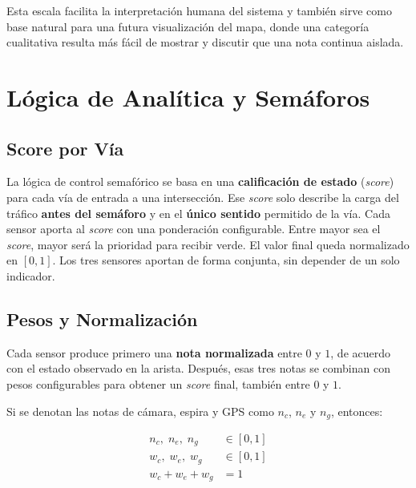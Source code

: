 \documentclass[12pt, a4paper]{article}
\begin{document}
Esta escala facilita la interpretación humana del sistema y también sirve como base natural para una futura visualización del mapa, donde una categoría cualitativa resulta más fácil de mostrar y discutir que una nota continua aislada.

\section{Lógica de Analítica y Semáforos}

\subsection{Score por Vía}

La lógica de control semafórico se basa en una \textbf{calificación de estado} (\textit{score}) para cada vía de entrada a una intersección. Ese \textit{score} solo describe la carga del tráfico \textbf{antes del semáforo} y en el \textbf{único sentido} permitido de la vía. Cada sensor aporta al \textit{score} con una ponderación configurable. Entre mayor sea el \textit{score}, mayor será la prioridad para recibir verde. El valor final queda normalizado en $[0, 1]$. Los tres sensores aportan de forma conjunta, sin depender de un solo indicador.

\subsection{Pesos y Normalización}

Cada sensor produce primero una \textbf{nota normalizada} entre $0$ y $1$, de acuerdo con el estado observado en la arista. Después, esas tres notas se combinan con pesos configurables para obtener un \textit{score} final, también entre $0$ y $1$.

Si se denotan las notas de cámara, espira y GPS como $n_c$, $n_e$ y $n_g$, entonces:

\begin{align}
    n_c,\; n_e,\; n_g &\in [0, 1] \\
    w_c,\; w_e,\; w_g &\in [0, 1] \\
    w_c + w_e + w_g &= 1
\end{align}
\end{document}
